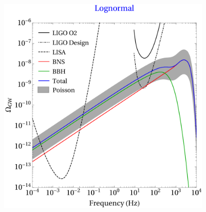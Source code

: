 \documentclass[xcolor={svgnames},compress]{beamer}
\begin{document}
\begin{frame}
\begin{columns}
\begin{column}{0.54\textwidth}
        \end{column}
        \begin{column}{0.54\textwidth} 
            \begin{figure}[htbp!]
                \centering
                \includegraphics[width = \textwidth]{./pic/omegagw-log.pdf}
            \end{figure}
        \end{column}
    \end{columns}
\end{frame}
\end{document}
